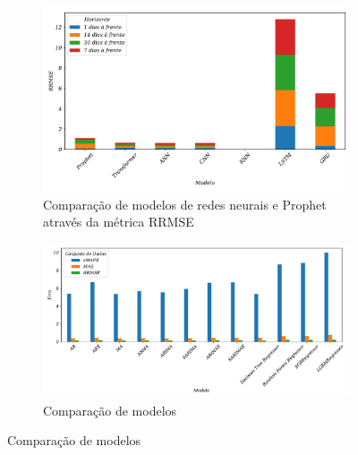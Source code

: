 \begin{figure}[H]
	\centering
	\caption{Análise comparativa dos modelos utilizando gráfico de barras}
	\begin{subfigure}{0.8\textwidth}
		\includegraphics[width=\linewidth]{Resultados/Figuras/rrmse_comparar}
		\caption{Comparação de modelos de redes neurais e Prophet através da métrica RRMSE}
		\label{fig:rrmse_comparar}
	\end{subfigure}
	
	\begin{subfigure}{0.8\textwidth}
		\includegraphics[width=\linewidth]{Resultados/Figuras/basic_comparar}
		\caption{Comparação de modelos}
		\label{fig:basic_comparar}
	\end{subfigure}
	
\end{figure}

